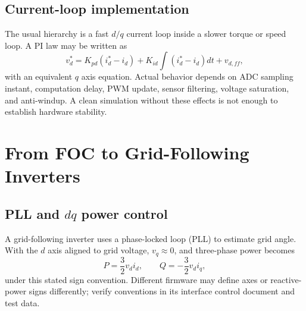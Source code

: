 \documentclass[11pt]{article}
\begin{document}
\subsection{Current-loop implementation}
The usual hierarchy is a fast $d/q$ current loop inside a slower torque or speed loop. A PI law may be written as
\[
v_d^*=K_{pd}(i_d^*-i_d)+K_{id}\int(i_d^*-i_d)dt+v_{d,ff},
\]
with an equivalent $q$ axis equation. Actual behavior depends on ADC sampling instant, computation delay, PWM update, sensor filtering, voltage saturation, and anti-windup. A clean simulation without these effects is not enough to establish hardware stability.

\section{From FOC to Grid-Following Inverters}
\subsection{PLL and $dq$ power control}
A grid-following inverter uses a phase-locked loop (PLL) to estimate grid angle. With the $d$ axis aligned to grid voltage, $v_q\approx0$, and three-phase power becomes
\[
P=\frac{3}{2}v_di_d,\qquad Q=-\frac{3}{2}v_di_q,
\]
under this stated sign convention. Different firmware may define axes or reactive-power signs differently; verify conventions in its interface control document and test data.

\begin{center}
\end{center}
\end{document}
